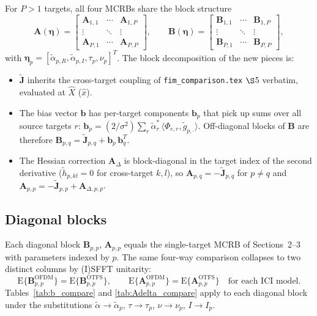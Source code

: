 \documentclass[11pt]{article}
\begin{document}
For \(P > 1\) targets, all four MCRBs share the block structure
\begin{equation}
    \bm{A}(\bm{\eta}) = \begin{bmatrix} \bm{A}_{1,1} & \cdots & \bm{A}_{1,P} \\ \vdots & \ddots & \vdots \\ \bm{A}_{P,1} & \cdots & \bm{A}_{P,P} \end{bmatrix}, \qquad \bm{B}(\bm{\eta}) = \begin{bmatrix} \bm{B}_{1,1} & \cdots & \bm{B}_{1,P} \\ \vdots & \ddots & \vdots \\ \bm{B}_{P,1} & \cdots & \bm{B}_{P,P} \end{bmatrix},
\end{equation}
with \(\bm{\eta}_p = [\tilde{\alpha}_{p,R}, \tilde{\alpha}_{p,I}, \tau_p, \nu_p]^T\). The block decomposition of the new pieces is:
\begin{itemize}
    \item \(\tilde{\bm{J}}\) inherits the cross-target coupling of \texttt{fim\_comparison.tex} \(\S\)5 verbatim, evaluated at \(\hat{X}\) (\(\hat{x}\)).
    \item The bias vector \(\bm{b}\) has per-target components \(\bm{b}_p\) that pick up sums over all source targets \(r\): \(\bm{b}_p = (2/\sigma^2)\sum_r \tilde{\alpha}_r^*\, \langle \Phi_{e,r}, \tilde{g}_{p,\cdot}\rangle\). Off-diagonal blocks of \(\bm{B}\) are therefore \(\bm{B}_{p,q} = \tilde{\bm{J}}_{p,q} + \bm{b}_p\, \bm{b}_q^T\).
    \item The Hessian correction \(\bm{A}_\Delta\) is block-diagonal in the target index of the second derivative (\(\tilde{h}_{p,kl} = 0\) for cross-target \(k,l\)), so \(\bm{A}_{p,q} = -\tilde{\bm{J}}_{p,q}\) for \(p \neq q\) and \(\bm{A}_{p,p} = -\tilde{\bm{J}}_{p,p} + \bm{A}_{\Delta, p,p}\).
\end{itemize}

\subsection*{Diagonal blocks}

Each diagonal block \(\bm{B}_{p,p}\), \(\bm{A}_{p,p}\) equals the single-target MCRB of Sections~2--3 with parameters indexed by \(p\). The same four-way comparison collapses to two distinct columns by (I)SFFT unitarity:
\begin{equation}
    \boxed{\;
    \mathrm{E}\{\bm{B}_{p,p}^{\text{OFDM}}\} = \mathrm{E}\{\bm{B}_{p,p}^{\text{OTFS}}\}, \qquad
    \mathrm{E}\{\bm{A}_{p,p}^{\text{OFDM}}\} = \mathrm{E}\{\bm{A}_{p,p}^{\text{OTFS}}\}
    \quad\text{for each ICI model.}
    \;}
\end{equation}
Tables~\ref{tab:b_compare} and \ref{tab:Adelta_compare} apply to each diagonal block under the substitutions \(\tilde{\alpha} \to \tilde{\alpha}_p\), \(\tau \to \tau_p\), \(\nu \to \nu_p\), \(I \to I_p\).
\end{document}
